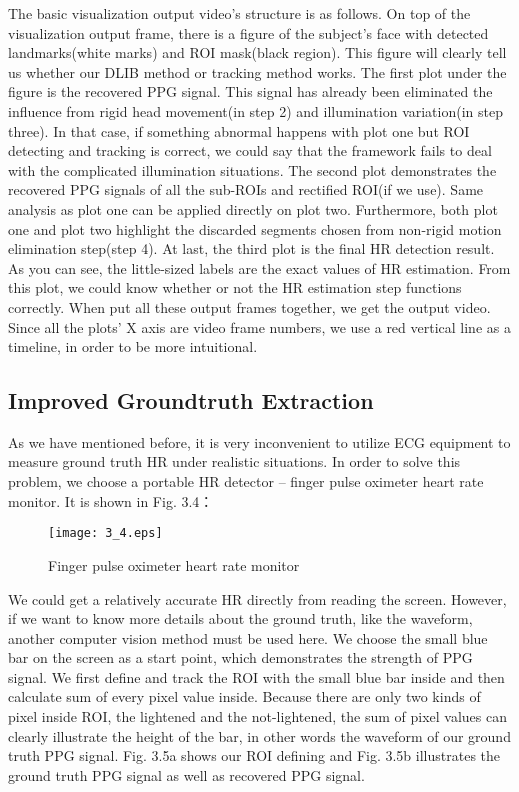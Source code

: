 The basic visualization output video's structure is as follows. On top of the visualization output frame, there is a figure of the subject's face with detected landmarks(white marks) and ROI mask(black region). This figure will clearly tell us whether our DLIB method or tracking method works. The first plot under the figure is the recovered PPG signal. This signal has already been eliminated the influence from rigid head movement(in step 2) and illumination variation(in step three). In that case, if something abnormal happens with plot one but ROI detecting and tracking is correct, we could say that the framework fails to deal with the complicated illumination situations. The second plot demonstrates the recovered PPG signals of all the sub-ROIs and rectified ROI(if we use). Same analysis as plot one can be applied directly on plot two. Furthermore, both plot one and plot two highlight the discarded segments chosen from non-rigid motion elimination step(step 4). At last, the third plot is the final HR detection result. As you can see, the little-sized labels are the exact values of HR estimation. From this plot, we could know whether or not the HR estimation step functions correctly. When put all these output frames together, we get the output video. Since all the plots' X axis are video frame numbers, we use a red vertical line as a timeline, in order to be more intuitional.


\subsection{Improved Groundtruth Extraction}
As we have mentioned before, it is very inconvenient to utilize ECG equipment to measure ground truth HR under realistic situations. In order to solve this problem, we choose a portable HR detector -- finger pulse oximeter heart rate monitor. It is shown in Fig. 3.4：

\begin{figure}[ht]
\centering
\texttt{[image: 3\_4.eps]}
\caption{Finger pulse oximeter heart rate monitor}\label{fig:noted-figure}
\end{figure}

We could get a relatively accurate HR directly from reading the screen. However, if we want to know more details about the ground truth, like the waveform, another computer vision method must be used here. We choose the small blue bar on the screen as a start point, which demonstrates the strength of PPG signal. We first define and track the ROI with the small blue bar inside and then calculate sum of every pixel value inside. Because there are only two kinds of pixel inside ROI, the lightened and the not-lightened, the sum of pixel values can clearly illustrate the height of the bar, in other words the waveform of our ground truth PPG signal. Fig. 3.5a shows our ROI defining and Fig. 3.5b illustrates the ground truth PPG signal as well as recovered PPG signal.   


